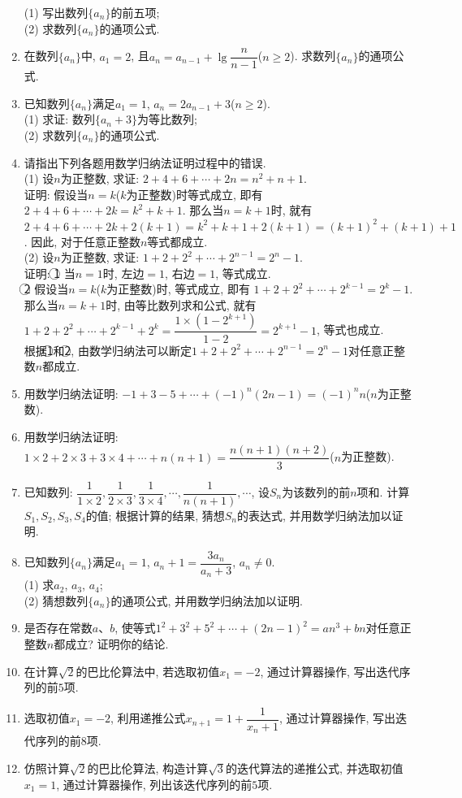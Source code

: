 \documentclass[10pt,a4paper]{article}
\begin{document}
\begin{enumerate}[1.]
(1) 写出数列$\{a_n\}$的前五项;\\
(2) 求数列$\{a_n\}$的通项公式.
\item 在数列$\{a_n\}$中, $a_1=2$, 且$a_n=a_{n-1}+\lg\dfrac n{n-1}$($n\ge 2$). 求数列$\{a_n\}$的通项公式.
\item 已知数列$\{a_n\}$满足$a_1=1$, $a_n=2a_{n-1}+3$($n\ge 2$).\\
(1) 求证: 数列$\{a_n+3\}$为等比数列;\\
(2) 求数列$\{a_n\}$的通项公式. 
\item 请指出下列各题用数学归纳法证明过程中的错误.\\
(1) 设$n$为正整数, 求证: $2+4+6+\cdots +2n=n^2+n+1$.\\
证明: 假设当$n=k$($k$为正整数)时等式成立, 即有$2+4+6+\cdots+2k=k^2+k+1$. 那么当$n=k+1$时, 就有$2+4+6+\cdots+2k+2(k+1)
=k^2+k+1+2(k+1)=(k+1)^2+(k+1)+1$. 因此, 对于任意正整数$n$等式都成立.\\
(2) 设$n$为正整数, 求证: $1+2+2^2+\cdots+2^{n-1}=2^n-1$.\\
证明: \textcircled{1} 当$n=1$时, 左边$=1$, 右边$=1$, 等式成立.\\
\textcircled{2} 假设当$n=k$($k$为正整数)时, 等式成立, 即有
$1+2+2^2+\cdots+2^{k-1}=2^k-1$. 那么当$n=k+1$时, 由等比数列求和公式, 就有$1+2+2^2+\cdots+2^{k-1}+2^k=\dfrac{1\times(1-2^{k+1})}{1-2}=2^{k+1}-1$, 等式也成立.\\
根据\textcircled{1}和\textcircled{2}, 由数学归纳法可以断定$1+2+2^2+\cdots+2^{n-1}=2^n-1$对任意正整数$n$都成立.
\item 用数学归纳法证明: $-1+3-5+\cdots+(-1)^n(2n-1)=(-1)^nn$($n$为正整数).
\item 用数学归纳法证明: $1\times 2+2\times 3+3\times 4+\cdots+n(n+1)=\dfrac{n(n+1)(n+2)}3$($n$为正整数). 
\item 已知数列: $\dfrac 1{1\times 2},\dfrac 1{2\times 3},\dfrac 1{3\times 4}, \cdots,\dfrac 1{n(n+1)}, \cdots$, 设$S_n$为该数列的前$n$项和. 计算$S_1,S_2,S_3,S_4$的值; 根据计算的结果, 猜想$S_n$的表达式, 并用数学归纳法加以证明.
\item 已知数列$\{a_n\}$满足$a_1=1$, $a_n+1=\dfrac{3a_n}{a_n+3}$, $a_n\ne 0$.\\
(1) 求$a_2$, $a_3$, $a_4$;\\
(2) 猜想数列$\{a_n\}$的通项公式, 并用数学归纳法加以证明.
\item 是否存在常数$a$、$b$, 使等式$1^2+3^2+5^2+\cdots+(2n-1)^2=an^3+bn$对任意正整数$n$都成立? 证明你的结论. 
\item 在计算$\sqrt 2$的巴比伦算法中, 若选取初值$x_1=-2$, 通过计算器操作, 写出迭代序列的前$5$项.
\item 选取初值$x_1=-2$, 利用递推公式$x_{n+1}=1+ \dfrac1{
x_n+1}$, 通过计算器操作, 写出迭代序列的前$8$项.
\item 仿照计算$\sqrt 2$的巴比伦算法, 构造计算$\sqrt 3$的迭代算法的递推公式, 并选取初值$x_1=1$, 通过计算器操作, 列出该迭代序列的前$5$项. 
\end{enumerate}
\end{document}
